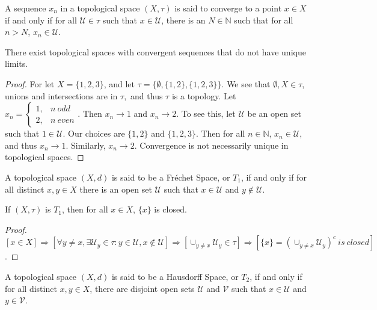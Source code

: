 \documentclass[crop=false,class=book,oneside]{standalone}
\begin{document}
            \begin{definition}
            A sequence $x_n$ in a topological space $(X,\tau)$ is said to converge to a point $x\in X$ if and only if for all $\mathcal{U}\in \tau$ such that $x\in \mathcal{U}$, there is an $N\in \mathbb{N}$ such that for all $n>N$, $x_n \in \mathcal{U}$.
            \end{definition}
            \begin{theorem}
            There exist topological spaces with convergent sequences that do not have unique limits.
            \end{theorem}
            \begin{proof}
            For let $X = \{1,2,3\}$, and let $\tau = \{\emptyset, \{1,2\},\{1,2,3\}\}$. We see that $\emptyset,X\in \tau$, unions and intersections are in $\tau,$ and thus $\tau$ is a topology. Let $x_n = \begin{cases} 1, & n\ odd \\ 2, & n\ even\end{cases}$. Then $x_n \rightarrow 1$ and $x_n \rightarrow 2$. To see this, let $\mathcal{U}$ be an open set such that $1\in \mathcal{U}$. Our choices are $\{1,2\}$ and $\{1,2,3\}$. Then for all $n\in \mathbb{N}$, $x_n \in \mathcal{U}$, and thus $x_n \rightarrow 1$. Similarly, $x_n \rightarrow 2$. Convergence is not necessarily unique in topological spaces.
            \end{proof}
            \begin{definition}
            A topological space $(X,d)$ is said to be a Fr\'{e}chet Space, or $T_1$, if and only if for all distinct $x,y\in X$ there is an open set $\mathcal{U}$ such that $x\in \mathcal{U}$ and $y\notin \mathcal{U}$.
            \end{definition}
            \begin{theorem}
            If $(X,\tau)$ is $T_1$, then for all $x\in X$, $\{x\}$ is closed.
            \end{theorem}
            \begin{proof}
            $[x\in X]\Rightarrow [\forall y\ne x, \exists \mathcal{U}_y\in \tau:y\in \mathcal{U},x\notin\mathcal{U}]\Rightarrow [\cup_{y\ne x}\mathcal{U}_y\in \tau]\Rightarrow [\{x\}=(\cup_{y\ne x}\mathcal{U}_y)^c\ is\ closed]$.
            \end{proof}
            \begin{definition}
            A topological space $(X,d)$ is said to be a Hausdorff Space, or $T_2$, if and only if for all distinct $x,y\in X$, there are disjoint open sets $\mathcal{U}$ and $\mathcal{V}$ such that $x\in \mathcal{U}$ and $y\in \mathcal{V}$.
            \end{definition}
\end{document}
